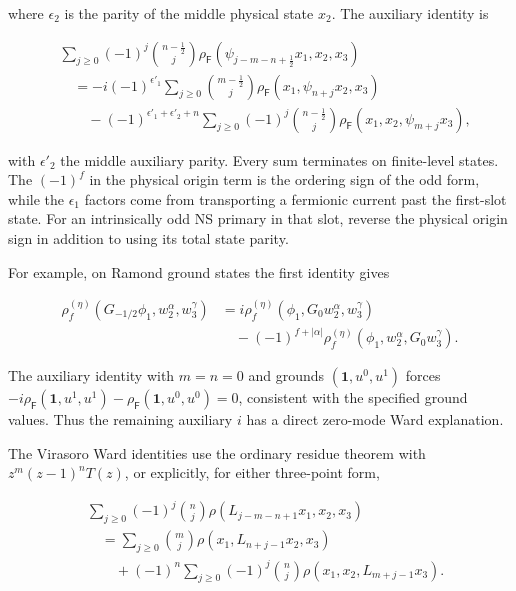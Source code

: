 \documentclass[11pt]{article}
\numberwithin{equation}{section}
\begin{document}
where $\epsilon_2$ is the parity of the middle physical state $x_2$.
The auxiliary identity is

\begin{equation}
\begin{aligned}
 &\sum_{j\ge0}(-1)^j\binom{n-\frac12}{j}
 \rho_{\mathsf F}(\psi_{j-m-n+\frac12}x_1,x_2,x_3)\\
 &\quad=-i(-1)^{\epsilon'_1}
       \sum_{j\ge0}\binom{m-\frac12}{j}
 \rho_{\mathsf F}(x_1,\psi_{n+j}x_2,x_3)\\
 &\qquad-(-1)^{\epsilon'_1+\epsilon'_2+n}
       \sum_{j\ge0}(-1)^j\binom{n-\frac12}{j}
 \rho_{\mathsf F}(x_1,x_2,\psi_{m+j}x_3),
\end{aligned}
\end{equation}

with $\epsilon'_2$ the middle auxiliary parity. Every sum terminates on
finite-level states. The $(-1)^f$ in the physical origin term is the
ordering sign of the odd form, while the $\epsilon_1$ factors come
from transporting a fermionic current past the first-slot state.
For an intrinsically odd NS primary in that slot, reverse the
physical origin sign in addition to using its total state parity.

For example, on Ramond ground states the first identity gives

\begin{align}
 \rho_f^{(\eta)}(G_{-1/2}\phi_1,w_2^\alpha,w_3^\gamma)
 &=i\rho_f^{(\eta)}(\phi_1,G_0w_2^\alpha,w_3^\gamma)\nonumber\\
 &\quad-(-1)^{f+|\alpha|}
 \rho_f^{(\eta)}(\phi_1,w_2^\alpha,G_0w_3^\gamma).
\end{align}

The auxiliary identity with $m=n=0$ and grounds
$(\mathbf1,u^0,u^1)$ forces
$-i\rho_{\mathsf F}(\mathbf1,u^1,u^1)
 -\rho_{\mathsf F}(\mathbf1,u^0,u^0)=0$,
consistent with the specified ground values.
Thus the remaining auxiliary $i$ has a direct zero-mode Ward explanation.

The Virasoro Ward identities use the ordinary residue theorem with
$z^m(z-1)^nT(z)$, or explicitly, for either three-point form,

\begin{equation}
\begin{aligned}
 &\sum_{j\ge0}(-1)^j\binom nj\rho(L_{j-m-n+1}x_1,x_2,x_3)\\
 &\quad=\sum_{j\ge0}\binom mj\rho(x_1,L_{n+j-1}x_2,x_3)\\
 &\qquad+(-1)^n\sum_{j\ge0}(-1)^j\binom nj\rho(x_1,x_2,L_{m+j-1}x_3).
\end{aligned}
\end{equation}
\end{document}
